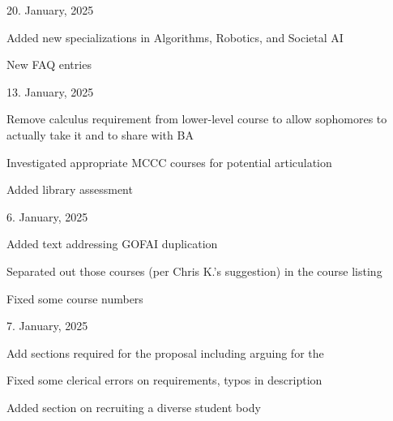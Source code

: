 
20. January, 2025

\begin{itemize*}
    \item Added new specializations in Algorithms, Robotics, and Societal AI
    \item New FAQ entries
\end{itemize*}

13. January, 2025

\begin{itemize*}
    \item Remove calculus requirement from lower-level  course to allow sophomores to actually take it and to share with BA
    \item Investigated appropriate MCCC courses for potential articulation
    \item Added library assessment
\end{itemize*}

6. January, 2025

\begin{itemize*}
    \item Added text addressing GOFAI duplication
    \item Separated out those courses (per Chris K.'s suggestion) in the course listing
    \item Fixed some course numbers
\end{itemize*}

7. January, 2025

\begin{itemize*}
    \item Add sections required for the  proposal including arguing for the 
    \item Fixed some clerical errors on requirements, typos in description
    \item Added section on recruiting a diverse student body
\end{itemize*}